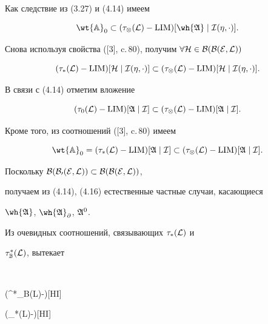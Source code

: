 Как следствие из (3.27) и (4.14) имеем


\begin{equation}


\wt{\Bbb A}_0\subset(\tau_\otimes(\cal L)-


\LIM)[\wh{\frak A}\mid\cal I(\eta,\cdot)].


\end{equation}


Снова используя свойства ([3], c.\,80), получим $\forall\cal H\in


\cal B(B(E,\cal L))$


\begin{equation}


(\tau_*(\cal L)-\LIM)[\cal H\mid\cal I(\eta,\cdot)]


\subset(\tau_\otimes(\cal L)-\LIM)[\cal H\mid\cal I(\eta,\cdot)].


\end{equation}


В связи с (4.14) отметим вложение


\begin{equation}


(\tau_0(\cal L)-\LIM)[\frak A\mid\cal I]\subset


(\tau_\otimes(\cal L)-\LIM)[\frak A\mid\cal I].


\end{equation}


Кроме того, из соотношений ([3], c.\,80) имеем


\begin{equation}


\wt{\Bbb A}_0=(\tau_*(\cal L)-\LIM)[\frak A\mid


\cal I]\subset(\tau_\otimes(\cal L)-\LIM)[\frak A\mid\cal I].


\end{equation}


Поскольку $\cal B(B_0(E,\cal L))\subset\cal B(B(E,\cal L))$,


получаем из (4.14), (4.16) естественные частные случаи, касающиеся


$\wh{\frak A}$, $\wh{\frak A}_\partial$, $\frak A^0$.


Из очевидных соотношений, связывающих $\tau_*(\cal L)$ и


$\tau^*_{\Bbb B}(\cal L)$, вытекает


$$


(\tau^*_{\Bbb B}(\cal L)-\LIM)[\cal H\mid\cal I]\subset


(\tau_*(\cal L)-\LIM)[\cal H\mid\cal I]


